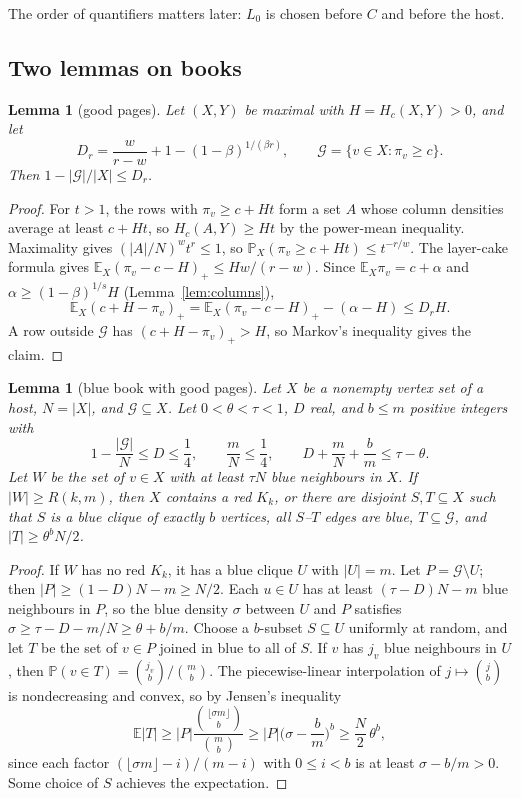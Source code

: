 \documentclass[11pt]{article}
\newtheorem{lemma}[theorem]{Lemma}
\theoremstyle{definition}
\theoremstyle{remark}
\newcommand{\E}{\mathbb{E}}
\newcommand{\Prob}{\mathbb{P}}
\begin{document}
The order of quantifiers matters later: $L_0$ is chosen before $C$ and before the host.

\subsection{Two lemmas on books}

\begin{lemma}[good pages]\label{lem:pages}
Let $(X,Y)$ be maximal with $H=H_c(X,Y)>0$, and let
\[
D_r=\frac w{r-w}+1-(1-\beta)^{1/(\beta r)},\qquad \mathcal G=\{v\in X:\pi_v\ge c\}.
\]
Then $1-|\mathcal G|/|X|\le D_r$.
\end{lemma}

\begin{proof}
For $t>1$, the rows with $\pi_v\ge c+Ht$ form a set $A$ whose column densities average at least $c+Ht$, so
$H_c(A,Y)\ge Ht$ by the power-mean inequality. Maximality gives $(|A|/N)^wt^r\le1$, so
$\Prob_X(\pi_v\ge c+Ht)\le t^{-r/w}$. The layer-cake formula gives $\E_X(\pi_v-c-H)_+\le Hw/(r-w)$. Since
$\E_X\pi_v=c+\alpha$ and $\alpha\ge(1-\beta)^{1/s}H$ (Lemma~\ref{lem:columns}),
\[
\E_X(c+H-\pi_v)_+=\E_X(\pi_v-c-H)_+-(\alpha-H)\le D_rH.
\]
A row outside $\mathcal G$ has $(c+H-\pi_v)_+>H$, so Markov's inequality gives the claim.
\end{proof}

\begin{lemma}[blue book with good pages]\label{lem:book}
Let $X$ be a nonempty vertex set of a host, $N=|X|$, and $\mathcal G\subseteq X$. Let $0<\theta<\tau<1$, $D$ real, and
$b\le m$ positive integers with
\[
1-\frac{|\mathcal G|}N\le D\le\frac14,\qquad \frac mN\le\frac14,\qquad D+\frac mN+\frac bm\le\tau-\theta.
\]
Let $W$ be the set of $v\in X$ with at least $\tau N$ blue neighbours in $X$. If $|W|\ge R(k,m)$, then $X$ contains a
red $K_k$, or there are disjoint $S,T\subseteq X$ such that $S$ is a blue clique of exactly $b$ vertices, all $S$--$T$
edges are blue, $T\subseteq\mathcal G$, and $|T|\ge\theta^bN/2$.
\end{lemma}

\begin{proof}
If $W$ has no red $K_k$, it has a blue clique $U$ with $|U|=m$. Let $P=\mathcal G\setminus U$; then
$|P|\ge(1-D)N-m\ge N/2$. Each $u\in U$ has at least $(\tau-D)N-m$ blue neighbours in $P$, so the blue density $\sigma$
between $U$ and $P$ satisfies $\sigma\ge\tau-D-m/N\ge\theta+b/m$. Choose a $b$-subset $S\subseteq U$ uniformly at random,
and let $T$ be the set of $v\in P$ joined in blue to all of $S$. If $v$ has $j_v$ blue neighbours in $U$, then
$\Prob(v\in T)=\binom{j_v}b/\binom mb$. The piecewise-linear interpolation of $j\mapsto\binom jb$ is nondecreasing and
convex, so by Jensen's inequality
\[
\E|T|\ge|P|\frac{\binom{\lfloor\sigma m\rfloor}b}{\binom mb}\ge|P|\Big(\sigma-\frac bm\Big)^b\ge\frac N2\,\theta^b,
\]
since each factor $(\lfloor\sigma m\rfloor-i)/(m-i)$ with $0\le i<b$ is at least $\sigma-b/m>0$. Some choice of $S$
achieves the expectation.
\end{proof}
\end{document}
